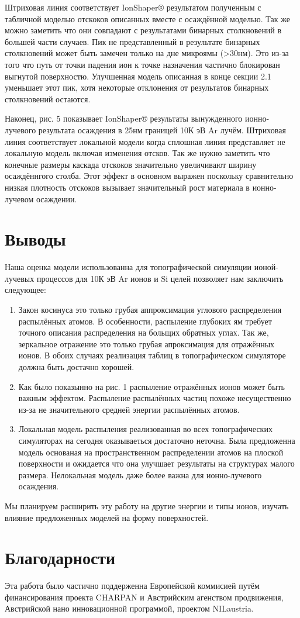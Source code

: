 \documentclass[a4paper,fontsize=12pt]{article}
\begin{document}
Штриховая линия соответствует IonShaper® результатом полученным с табличной моделью отскоков описанных вместе с осаждённой моделью. Так же можно заметить что они совпадают с результатами бинарных столкновений в большей части случаев. Пик не представленный в результате бинарных столкновений может быть замечен только на дне микроямы (\textgreater 30нм). Это из-за того что путь от точки падения ион к точке назначения частично блокирован выгнутой поверхностю. Улучшенная модель описанная в конце секции 2.1 уменьшает этот пик, хотя некоторые отклонения от результатов бинарных столкновений остаются.

Наконец, рис. 5 показывает IonShaper® результаты вынужденного ионно-лучевого результата осаждения в 25нм границей 10К эВ Ar лучём. Штриховая линия соответствует локальной модели когда сплошная линия представляет не локальную модель включая изменения отсков. Так же нужно заметить что конечные размеры каскада отскоков значительно увеличивают ширину осаждённгого столба. Этот эффект в основном выражен поскольку сравнительно низкая плотность отскоков вызывает значительный рост материала в ионно-лучевом осаждении.

\section{Выводы}
Наша оценка модели использованна для топографической симуляции ионой-лучевых процессов для 10К эВ Ar ионов и Si целей позволяет нам заключить следующее:

\begin{enumerate}
  \item Закон косинуса это только грубая аппроксимация углового распределения распылённых атомов. В особенности, распыление глубоких ям требует точного описания распределения на больщих обратных углах. Так же, зеркальное отражение это только грубая апроксимация для отражённых ионов. В обоих случаях реализация таблиц в топографическом симуляторе должна быть достачно хорошей.
  \item Как было показынно на рис. 1 распыление отражённых ионов может быть важным эффектом. Распыление распылённых частиц похоже несущественно из-за не значительного средней энергии распылённых атомов.
  \item Локальная модель распыления реализованная во всех топографических симуляторах на сегодня оказываеться достаточно неточна. Была предложенна модель основаная на пространственном распределении атомов на плоской поверхности и ожидается что она улучшает результаты на структурах малого размера. Нелокальная модель даже более важна для ионно-лучевого осаждения.
\end{enumerate}

Мы планируем расширить эту работу на другие энергии и типы ионов, изучать влияние предложенных моделей на форму поверхностей.

\section{Благодарности}

Эта работа было частично поддерженна Европейской коммисией путём финансирования проекта CHARPAN и Австрийским агенством продвижения, Австрийской нано инновационной программой, проектом NILaustria.
\end{document}

